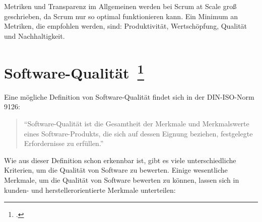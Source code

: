 Metriken und Transparenz im Allgemeinen werden bei Scrum at Scale groß geschrieben, da Scrum nur so optimal funktionieren kann.
Ein Minimum an Metriken, die empfohlen werden, sind: Produktivität, Wertschöpfung, Qualität und Nachhaltigkeit.

\clearpage
\section[Software-Qualität]{Software-Qualität~\footcite[vgl.][Kapitel 1.2]{hoffmann_software_qualitat_2013}}

Eine mögliche Definition von Software-Qualität findet sich in der DIN-ISO-Norm 9126:

\begin{quote}
  ``Software-Qualität ist die Gesamtheit der Merkmale und Merkmalswerte eines Software-Produkts, die sich auf dessen Eignung beziehen, festgelegte Erfordernisse zu erfüllen.''
\end{quote}

Wie aus dieser Definition schon erkennbar ist, gibt es viele unterschiedliche Kriterien, um die Qualität von Software zu bewerten.
Einige wesentliche Merkmale, um die Qualität von Software bewerten zu können, lassen sich in kunden- und herstellerorientierte Merkmale unterteilen:

